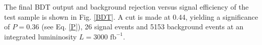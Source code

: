 \documentclass[10pt,a4paper]{article}
\begin{document}
The final BDT output and background rejection versus signal efficiency of the test sample is shown in Fig. \ref{BDT}. A cut is made at 0.44, yielding a significance of $P=0.36$ (see Eq. \eqref{P}), 26 signal events and 5153 background events at an integrated lumininosity $L = 3000 \text{ fb}^{-1}$.


\end{document}
